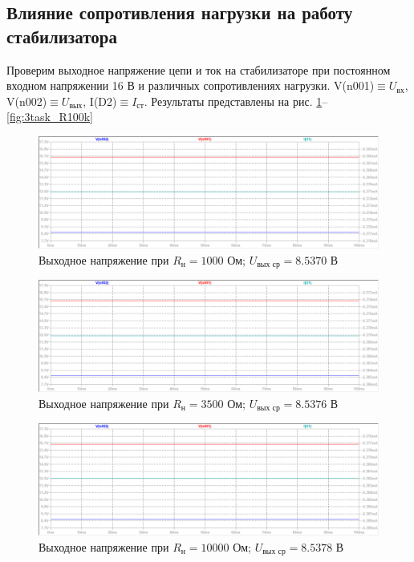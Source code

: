 \documentclass[a4paper, 12pt]{article}
\begin{document}
    \subsection{Влияние сопротивления нагрузки на работу стабилизатора}
    Проверим выходное напряжение цепи и ток на стабилизаторе при постоянном
    входном напряжении 16 В и различных сопротивлениях нагрузки. V(n001)$\equiv U_{\text{вх}}$,
    V(n002)$\equiv U_{\text{вых}}$, I(D2)$\equiv I_{\text{ст}}$. Результаты представлены на рис.
    \ref{fig:3task_R1k}--\ref{fig:3task_R100k}
    \begin{figure}[H]
        \centering
        \includegraphics[scale=0.46]{3task_R1k.png}
        \captionsetup{skip=0pt}
        \caption{Выходное напряжение при $R_{\text{н}}=1000$ Ом; $U_{\text{вых ср}}=8.5370$ В}
        \label{fig:3task_R1k}
    \end{figure}
    \begin{figure}[H]
        \centering
        \includegraphics[scale=0.46]{3task_R3_5k.png}
        \captionsetup{skip=0pt}
        \caption{Выходное напряжение при $R_{\text{н}}=3500$ Ом; $U_{\text{вых ср}}=8.5376$ В}
        \label{fig:3task_R3_5k}
    \end{figure}
    \begin{figure}[H]
        \centering
        \includegraphics[scale=0.46]{3task_R10k.png}
        \captionsetup{skip=0pt}
        \caption{Выходное напряжение при $R_{\text{н}}=10000$ Ом; $U_{\text{вых ср}}=8.5378$ В}
        \label{fig:3task_R10k}
    \end{figure}
\end{document}
